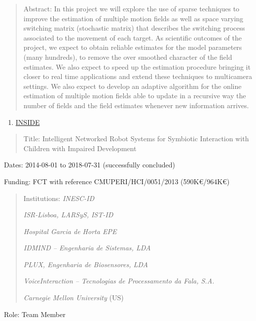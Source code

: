\documentclass[
]{article}
\begin{document}
\begin{quote}
Abstract: In this project we will explore the use of sparse techniques
to improve the estimation of multiple motion fields as well as space
varying switching matrix (stochastic matrix) that describes the
switching process associated to the movement of each target. As
scientific outcomes of the project, we expect to obtain reliable
estimates for the model parameters (many hundreds), to remove the over
smoothed character of the field estimates. We also expect to speed up
the estimation procedure bringing it closer to real time applications
and extend these techniques to multicamera settings. We also expect to
develop an adaptive algorithm for the online estimation of multiple
motion fields able to update in a recursive way the number of fields and
the field estimates whenever new information arrives.
\end{quote}

\begin{enumerate}
\def\labelenumi{\arabic{enumi}.}
\setcounter{enumi}{8}
\item
  \ul{INSIDE}
\end{enumerate}

\begin{quote}
Title: Intelligent Networked Robot Systems for Symbiotic Interaction
with Children with Impaired Development
\end{quote}

Dates: 2014-08-01 to 2018-07-31 (successfully concluded)

Funding: FCT with reference CMUP­ERI/HCI/0051/2013 (590K€/964K€)

\begin{quote}
Institutions: \emph{INESC-ID}

\emph{ISR-Lisboa, LARSyS, IST-ID}

\emph{Hospital Garcia de Horta EPE}

\emph{IDMIND -- Engenharia de Sistemas, LDA}

\emph{PLUX, Engenharia de Biosensores, LDA}

\emph{VoiceInteraction -- Tecnologias de Processamento da Fala, S.A.}

\emph{Carnegie Mellon University} (US)
\end{quote}

Role: Team Member
\end{document}

